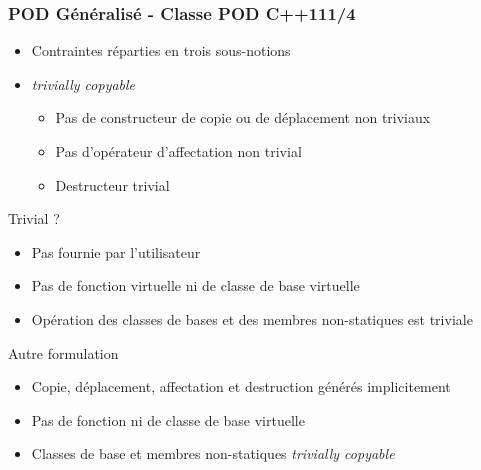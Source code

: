 \documentclass[C++.tex]{subfiles}
\begin{document}
\begin{frame}[fragile]
	\frametitle{POD Généralisé - Classe POD C++11\titlehfill{}1/4}
	\begin{itemize}
		\item Contraintes réparties en trois sous-notions
		\item \textit{trivially copyable}
		\begin{itemize}
			\item Pas de constructeur de copie ou de déplacement non triviaux
			\item Pas d'opérateur d'affectation non trivial
			\item Destructeur trivial
		\end{itemize}
	\end{itemize}

	\pause

	\begin{block}{Trivial ?}
		\begin{itemize}
			\item Pas fournie par l'utilisateur
			\item Pas de fonction virtuelle ni de classe de base virtuelle
			\item Opération des classes de bases et des membres non-statiques est triviale
		\end{itemize}
	\end{block}

	\pause

	\begin{block}{Autre formulation}
		\begin{itemize}
			\item Copie, déplacement, affectation et destruction générés implicitement
			\item Pas de fonction ni de classe de base virtuelle
			\item Classes de base et membres non-statiques \textit{trivially copyable}
		\end{itemize}
	\end{block}
\end{frame}
\end{document}
